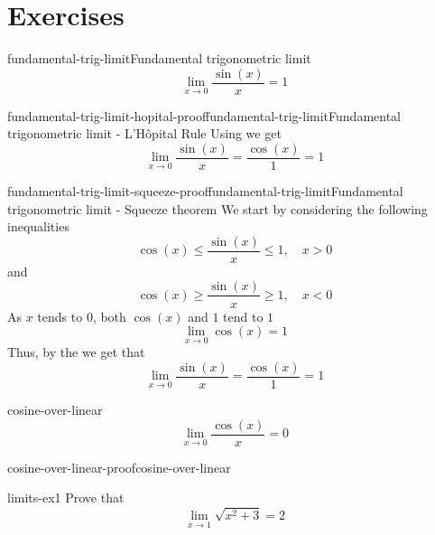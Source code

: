 \documentclass[preview]{standalone}
\begin{document}
\genpage

\section{Exercises}

\begin{snippetproposition}{fundamental-trig-limit}{Fundamental trigonometric limit}
    \[
        \lim_{x \to 0} \frac{\sin(x)}{x} = 1
    \]
\end{snippetproposition}

\begin{snippetproof}{fundamental-trig-limit-hopital-proof}{fundamental-trig-limit}{Fundamental trigonometric limit - L'Hôpital Rule}
    Using \lhopitalrule we get
    \[
        \lim_{x \to 0} \frac{\sin(x)}{x} = \frac{\cos(x)}{1} = 1
    \]
\end{snippetproof}

\begin{snippetproof}{fundamental-trig-limit-squeeze-proof}{fundamental-trig-limit}{Fundamental trigonometric limit - Squeeze theorem}
    We start by considering the following inequalities
    \[ \cos(x) \leq \frac{\sin(x)}{x} \leq 1, \quad x>0 \]
    and
    \[ \cos(x) \geq \frac{\sin(x)}{x} \geq 1, \quad x<0 \]
    As \(x\) tends to \(0\), both \(\cos(x)\) and \(1\) tend to \(1\)
    \[ \lim_{x\to 0} \cos(x)=1 \]
    Thus, by the \squeezetheorem we get that
    \[
        \lim_{x \to 0} \frac{\sin(x)}{x} = \frac{\cos(x)}{1} = 1
    \]
\end{snippetproof}

\begin{snippetproposition}{cosine-over-linear}{}
    \[
        \lim_{x \to 0} \frac{\cos(x)}{x} = 0
    \]
\end{snippetproposition}

\begin{snippetproof}{cosine-over-linear-proof}{cosine-over-linear}{}
    \todo
\end{snippetproof}

\begin{snippetexercise}{limits-ex1}{}
    Prove that
    \[
        \lim_{x\to 1} \sqrt{x^2 + 3} = 2
    \]
\end{snippetexercise}
\end{document}
